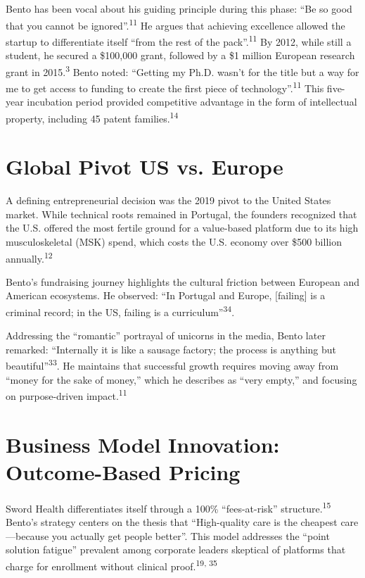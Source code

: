 \documentclass[12pt]{article}
\begin{document}
Bento has been vocal about his guiding principle during this phase: ``Be so good that you cannot be ignored''.\textsuperscript{11} He argues that achieving excellence allowed the startup to differentiate itself ``from the rest of the pack''.\textsuperscript{11} By 2012, while still a student, he secured a \$100,000 grant, followed by a \$1 million European research grant in 2015.\textsuperscript{3} Bento noted: ``Getting my Ph.D. wasn't for the title but a way for me to get access to funding to create the first piece of technology''.\textsuperscript{11} This five-year incubation period provided competitive advantage in the form of intellectual property, including 45 patent families.\textsuperscript{14}

\section{Global Pivot US vs. Europe}
A defining entrepreneurial decision was the 2019 pivot to the United States market. While technical roots remained in Portugal, the founders recognized that the U.S. offered the most fertile ground for a value-based platform due to its high musculoskeletal (MSK) spend, which costs the U.S. economy over \$500 billion annually.\textsuperscript{12}

Bento’s fundraising journey highlights the cultural friction between European and American ecosystems. He observed: ``In Portugal and Europe, [failing] is a criminal record; in the US, failing is a curriculum''\textsuperscript{34}.

Addressing the ``romantic'' portrayal of unicorns in the media, Bento later remarked: ``Internally it is like a sausage factory; the process is anything but beautiful''\textsuperscript{33}. He maintains that successful growth requires moving away from ``money for the sake of money,'' which he describes as ``very empty,'' and focusing on purpose-driven impact.\textsuperscript{11}

\section{Business Model Innovation: Outcome-Based Pricing}
Sword Health differentiates itself through a 100\% ``fees-at-risk'' structure.\textsuperscript{15} Bento’s strategy centers on the thesis that ``High-quality care is the cheapest care—because you actually get people better''. This model addresses the ``point solution fatigue'' prevalent among corporate leaders skeptical of platforms that charge for enrollment without clinical proof.\textsuperscript{19, 35}
\end{document}
